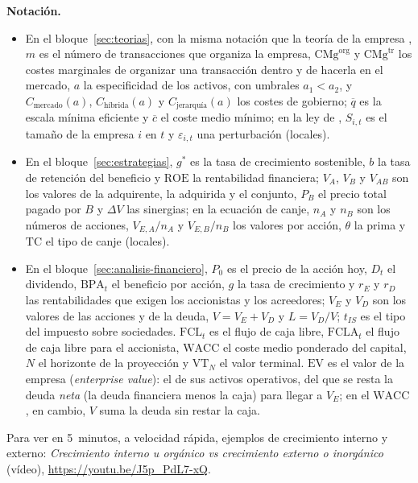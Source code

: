 \documentclass[11pt]{article}
\begin{document}
\begin{anotaciones}
\textbf{Notación.}
\begin{itemize}
\item En el bloque~\ref{sec:teorias}, con la misma notación que la teoría de la empresa , $m$ es el número de transacciones que organiza la empresa, $\mathrm{CMg}^{\mathrm{org}}$ y $\mathrm{CMg}^{\mathrm{tr}}$ los costes marginales de organizar una transacción dentro y de hacerla en el mercado, $a$ la especificidad de los activos, con umbrales $a_1<a_2$, y $C_{\text{mercado}}(a)$, $C_{\text{híbrida}}(a)$ y $C_{\text{jerarquía}}(a)$ los costes de gobierno; $\overline q$ es la escala mínima eficiente y $\overline c$ el coste medio mínimo; en la ley de , $S_{i,t}$ es el tamaño de la empresa $i$ en $t$ y $\varepsilon_{i,t}$ una perturbación (locales).
\item En el bloque~\ref{sec:estrategias}, $g^{*}$ es la tasa de crecimiento sostenible, $b$ la tasa de retención del beneficio y $\mathrm{ROE}$ la rentabilidad financiera; $V_A$, $V_B$ y $V_{AB}$ son los valores de la adquirente, la adquirida y el conjunto, $P_B$ el precio total pagado por $B$ y $\Delta V$ las sinergias; en la ecuación de canje, $n_A$ y $n_B$ son los números de acciones, $V_{E,A}/n_A$ y $V_{E,B}/n_B$ los valores por acción, $\theta$ la prima y $\mathrm{TC}$ el tipo de canje (locales).
\item En el bloque~\ref{sec:analisis-financiero}, $P_0$ es el precio de la acción hoy, $D_t$ el dividendo, $\mathrm{BPA}_t$ el beneficio por acción, $g$ la tasa de crecimiento y $r_E$ y $r_D$ las rentabilidades que exigen los accionistas y los acreedores; $V_E$ y $V_D$ son los valores de las acciones y de la deuda, $V=V_E+V_D$ y $L=V_D/V$; $t_{IS}$ es el tipo del impuesto sobre sociedades. $\mathrm{FCL}_t$ es el flujo de caja libre, $\mathrm{FCLA}_t$ el flujo de caja libre para el accionista, $\mathrm{WACC}$ el coste medio ponderado del capital, $N$ el horizonte de la proyección y $\mathrm{VT}_N$ el valor terminal. $\mathrm{EV}$ es el valor de la empresa (\emph{enterprise value}): el de sus activos operativos, del que se resta la deuda \emph{neta} (la deuda financiera menos la caja) para llegar a $V_E$; en el $\mathrm{WACC}$, en cambio, $V$ suma la deuda sin restar la caja.
\end{itemize}
\end{anotaciones}

\begin{anotaciones}
Para ver en 5~minutos, a velocidad rápida, ejemplos de crecimiento interno y externo: \emph{Crecimiento interno u orgánico vs crecimiento externo o inorgánico} (vídeo), \url{https://youtu.be/J5p_PdL7-xQ}.
\end{anotaciones}
\end{document}
